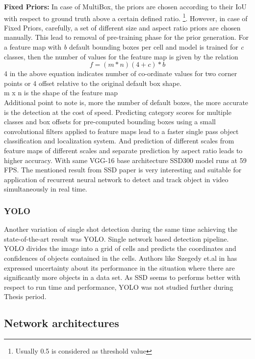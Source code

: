 \textbf{Fixed Priors:} In case of MultiBox, the priors are chosen according to their IoU with respect to ground truth above a certain defined ratio. \footnote{Usually 0.5 is considered as threshold value}.
However, in case of Fixed Priors, carefully, a set of different size and aspect ratio priors are chosen manually. This lead to removal of pre-training phase for the prior generation. For a feature map with \textit{b} default bounding boxes per cell and model is trained for \textit{c} classes, then the number of values for the feature map is given by the relation 
\begin{equation}
	f = (m * n )  (4 + c) * b
\end {equation}
4 in the above equation indicates number of co-ordinate values for two corner points or 4 offset relative to the original default box shape. \\
m x n is the shape of the feature map \\
 Additional point to note is, more the number of default boxes, the more accurate is the detection at the cost of speed.
Predicting category scores for multiple classes and box offsets for pre-computed bounding boxes using a small convolutional filters applied to feature maps lead to a faster single pass object classification and localization system. And prediction of different scales from feature maps of different scales and separate prediction by aspect ratio leads to higher accuracy. \cite{liu2016ssd} With same VGG-16 base architecture SSD300 model runs at 59 FPS. The mentioned result from SSD paper is very interesting and suitable for application of recurrent neural network to detect and track object in video simultaneously in real time.

\subsubsection{YOLO}
Another variation of single shot detection during the same time achieving the state-of-the-art result was YOLO. Single network based detection pipeline. YOLO divides the image into a grid of cells and predicts the coordinates and confidences of objects contained in the cells. Authors like Szegedy et.al in \cite{szegedy2014scalable} has expressed uncertainty about its performance in the situation where there are significantly more objects in a data set. As SSD seems to performs better with respect to run time and performance, YOLO was not studied further during Thesis period.

\subsection{Network architectures}

